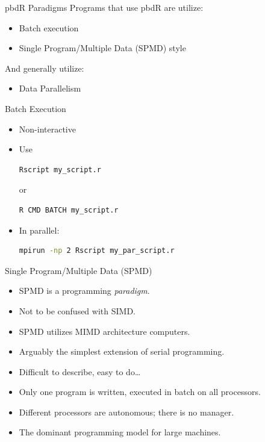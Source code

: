 \begin{frame}
  \begin{block}{pbdR Paradigms}
  Programs that use pbdR are utilize:
  \begin{itemize}[<+-|alert@+>]
   \item Batch execution
   \item Single Program/Multiple Data (SPMD) style
   \\[.2cm]
   \end{itemize}
    And generally utilize:
   \begin{itemize}
   \item Data Parallelism
  \end{itemize}
  \end{block}
\end{frame}


\begin{frame}[fragile]
  \begin{block}{Batch Execution}\pause
    \begin{itemize}
      \item Non-interactive
      \item Use
\vspace{-.4cm}
\begin{lstlisting}[language=sh]
Rscript my_script.r
\end{lstlisting}
or\vspace{-.4cm}
\begin{lstlisting}[language=sh]
R CMD BATCH my_script.r
\end{lstlisting}
      \item In parallel:
\vspace{-.4cm}
\begin{lstlisting}[language=sh]
mpirun -np 2 Rscript my_par_script.r
\end{lstlisting}
    \end{itemize}
  \end{block}
\end{frame}


\begin{frame}
  \begin{block}{Single Program/Multiple Data (SPMD)}\pause
    \begin{itemize}
      \item SPMD is a programming \emph{paradigm}.
      \item Not to be confused with SIMD.
      \item SPMD utilizes MIMD architecture computers.
      \item Arguably the simplest extension of serial programming.
      \item Difficult to describe, easy to do\dots
      \item Only one program is written, executed in batch on all processors.
      \item Different processors are autonomous; there is no manager.
      \item The dominant programming model for large machines.
    \end{itemize}
  \end{block}
\end{frame}


